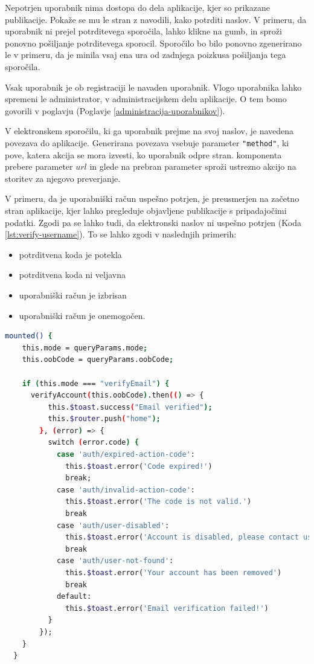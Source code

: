 \documentclass[a4paper, 12pt]{book}
\begin{document}
Nepotrjen uporabnik nima dostopa do dela aplikacije, kjer so prikazane publikacije. Pokaže se mu le stran z navodili, kako potrditi naslov. V primeru, da uporabnik ni prejel potrditevega sporočila, lahko klikne na gumb, in sproži ponovno pošiljanje potrditevega sporocil. Sporočilo bo bilo ponovno zgenerirano le v primeru, da je minila vsaj ena ura od zadnjega poizkusa pošiljanja tega sporočila.

Vsak uporabnik je ob registraciji le navaden uporabnik. Vlogo uporabnika lahko spremeni le administrator, v administracijskem delu aplikacije. O tem bomo govorili v poglavju  (Poglavje \ref{administracija-uporabnikov}).

V elektronskem sporočilu, ki ga uporabnik prejme na svoj naslov, je navedena povezava do aplikacije. Generirana povezava vsebuje parameter \verb="method"=, ki pove, katera akcija se mora izvesti, ko uporabnik odpre stran. komponenta prebere parameter $url$ in glede na prebran parameter sproži ustrezno akcijo na storitev za njegovo preverjanje. 

V primeru, da je uporabniški račun uspešno potrjen, je preusmerjen na začetno stran aplikacije, kjer lahko pregleduje objavljene publikacije s pripadajočimi podatki. Zgodi pa se lahko tudi, da elektronski naslov ni uspešno potrjen (Koda \ref{lst:verify-username}). To se lahko zgodi v naslednjih primerih:
\begin{itemize}
  \item potrditvena koda je potekla
  \item potrditvena koda ni veljavna
  \item uporabniški račun je izbrisan
  \item uporabniški račun je onemogočen.
\end{itemize}

\begin{lstlisting}[language=bash, style=mystyle,caption={Primer kode, za preverjanje uporabnika.}, label=lst:verify-username]
  mounted() {
    this.mode = queryParams.mode;
    this.oobCode = queryParams.oobCode;

    if (this.mode === "verifyEmail") {
      verifyAccount(this.oobCode).then(() => {
          this.$toast.success("Email verified");
          this.$router.push("home");
        }, (error) => {
          switch (error.code) {
            case 'auth/expired-action-code':
              this.$toast.error('Code expired!')
              break;
            case 'auth/invalid-action-code':
              this.$toast.error('The code is not valid.')
              break
            case 'auth/user-disabled':
              this.$toast.error('Account is disabled, please contact us at support@example.com')
              break
            case 'auth/user-not-found':
              this.$toast.error('Your account has been removed')
              break
            default:
              this.$toast.error('Email verification failed!')
          }
        });
    }
  }
\end{lstlisting}
\end{document}
